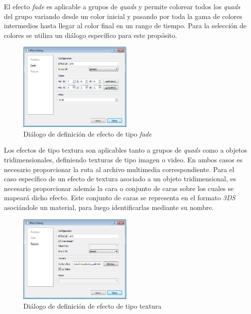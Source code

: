 El efecto \emph{fade} es aplicable a grupos de \emph{quads} y permite colorear todos los \emph{quads} del grupo variando desde un color inicial y pasando por toda la gama de colores intermedios hasta llegar al color final en un rango de tiempo. Para la selección de colores se utiliza un diálogo específico para este propósito.

\begin{figure}[H]
  \centering
    \includegraphics[width=0.5\textwidth]{./Cap5_vmt/vmt_EfectDialog2.png}
  \caption[Imagen propia.]{Diálogo de definición de efecto de tipo \emph{fade}}
  \label{fig:VMT-EffectFade}
\end{figure}

Los efectos de tipo textura son aplicables tanto a grupos de \emph{quads} como a objetos tridimensionales, definiendo texturas de tipo imagen o video. En ambos casos es necesario proporcionar la ruta al archivo multimedia correspondiente. Para el caso específico de un efecto de textura asociado a un objeto tridimensional, es necesario proporcionar además la cara o conjunto de caras sobre los cuales se mapeará dicho efecto. Este conjunto de caras se representa en el formato \emph{3DS} asociándole un material, para luego identificarlas mediante su nombre.

\begin{figure}[H]
  \centering
    \includegraphics[width=0.5\textwidth]{./Cap5_vmt/vmt_EfectDialog3.png}
  \caption[Imagen propia.]{Diálogo de definición de efecto de tipo textura}
  \label{fig:VMT-EffectTexture}
\end{figure}

